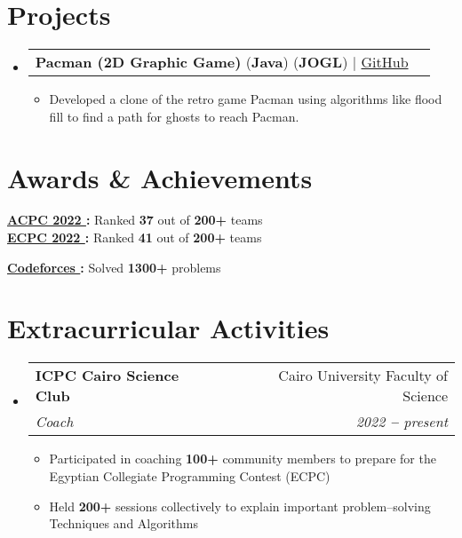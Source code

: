 \documentclass[letterpaper,11pt]{article}
\makeatletter
\newcommand{\resumeItem}[1]{
  \item\small{
    {#1 \vspace{-2pt}}
  }
}
\newcommand{\resumeSubheading}[4]{
  \vspace{-2pt}\item
    \begin{tabular*}{0.97\textwidth}[t]{l@{\extracolsep{\fill}}r}
      \textbf{#1} & #2 \\
      \textit{\small#3} & \textit{\small #4} \\
    \end{tabular*}\vspace{-7pt}
}
\newcommand{\resumeProjectHeading}[2]{
    \vspace{-2pt}\item
    \begin{tabular*}{0.97\textwidth}{l@{\extracolsep{\fill}}r}
      \small#1 & #2 \\
    \end{tabular*}\vspace{-7pt}
}
\newcommand{\resumeSubHeadingListStart}{\begin{itemize}[leftmargin=0.15in, label={}]}
\newcommand{\resumeSubHeadingListEnd}{\end{itemize}}
\newcommand{\resumeItemListStart}{\begin{itemize}}
\newcommand{\resumeItemListEnd}{\end{itemize}\vspace{-5pt}}
\makeatother
\begin{document}

\section{Projects}
\vspace{3pt}
\resumeSubHeadingListStart


\resumeProjectHeading
{\textbf{Pacman (2D Graphic Game)} (\textbf{Java}) (\textbf{JOGL}) $|$ \href{https://github.com/Yossef-Magdy/Pacman}{GitHub \faLink}}{}
\resumeItemListStart
\resumeItem{Developed a clone of the retro game Pacman using algorithms like flood fill to find a path for ghosts to reach Pacman.}
\resumeItemListEnd

\resumeSubHeadingListEnd





\section{Awards \& Achievements}
  \vspace{2pt}
  \resumeSubHeadingListStart
    \small{\item{
        \textbf{\href{https://drive.google.com/file/d/1kxMcLRh3jysNW1Yy4loKLkkGkbccFPU_/view?usp=drive_link}{ACPC 2022 }:}
        {Ranked \textbf{37} out of \textbf{200+} teams} 
        \\ \vspace{3pt}
		\textbf{\href{https://drive.google.com/file/d/1p7HnOlci6spjWYa2FNIF-FpbT-O8zQ8h/view?usp=drive_link}{ECPC 2022 }:} 
		{Ranked \textbf{41} out of \textbf{200+} teams} 
		\\ \vspace{3pt}
		
		\textbf{{\href{https://codeforces.com/profile/Yossef}{Codeforces }}:}
		{Solved \textbf{1300+} problems} \\ 
		\vspace{3pt}
    }}
  \resumeSubHeadingListEnd






\section{Extracurricular Activities}

\resumeSubHeadingListStart

\resumeSubheading{ICPC Cairo Science Club \href{https://www.facebook.com/sci.cpc}{\faLink}}{Cairo University Faculty of Science}
{Coach} {2022 \textbf{--} present}
\resumeItemListStart
\resumeItem{Participated in coaching \textbf{100+} community members to prepare for the Egyptian Collegiate Programming Contest (ECPC)}
\resumeItem{Held \textbf{200+} sessions collectively to explain important problem–solving Techniques and Algorithms}
\resumeItemListEnd

\resumeSubHeadingListEnd
\end{document}
